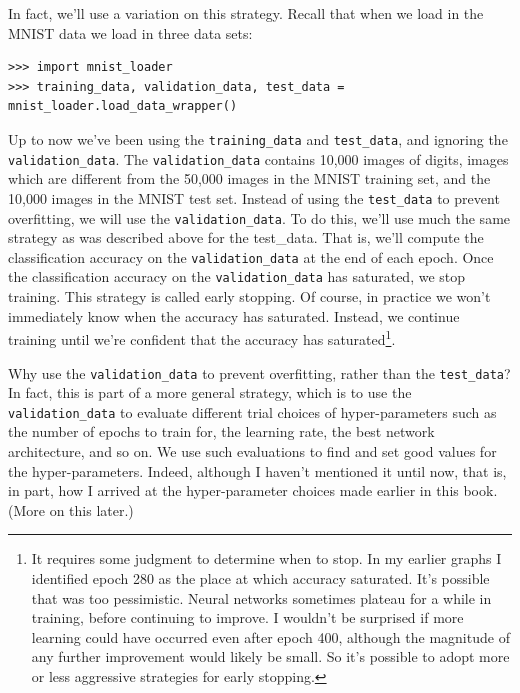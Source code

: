 \documentclass[a4paper,twoside,10pt]{book}
\begin{document}
In fact, we'll use a variation on this strategy. Recall that when we load in the MNIST data we load in three data sets:
\begin{lstlisting}
>>> import mnist_loader 
>>> training_data, validation_data, test_data = mnist_loader.load_data_wrapper()

\end{lstlisting}
Up to now we've been using the \texttt{training\_data} and \texttt{test\_data}, and ignoring the \texttt{validation\_data}. The \texttt{validation\_data} contains 10,000 images of digits, images which are different from the 50,000 images in the MNIST training set, and the 10,000 images in the MNIST test set. Instead of using the \texttt{test\_data} to prevent overfitting, we will use the \texttt{validation\_data}. To do this, we'll use much the same strategy as was described above for the test\_data. That is, we'll compute the classification accuracy on the \texttt{validation\_data} at the end of each epoch. Once the classification accuracy on the \texttt{validation\_data} has saturated, we stop training. This strategy is called early stopping. Of course, in practice we won't immediately know when the accuracy has saturated. Instead, we continue training until we're confident that the accuracy has saturated\footnote{It requires some judgment to determine when to stop. In my earlier graphs I identified epoch 280 as the place at which accuracy saturated. It's possible that was too pessimistic. Neural networks sometimes plateau for a while in training, before continuing to improve. I wouldn't be surprised if more learning could have occurred even after epoch 400, although the magnitude of any further improvement would likely be small. So it's possible to adopt more or less aggressive strategies for early stopping.}.

Why use the \texttt{validation\_data} to prevent overfitting, rather than the \texttt{test\_data}? In fact, this is part of a more general strategy, which is to use the \texttt{validation\_data} to evaluate different trial choices of hyper-parameters such as the number of epochs to train for, the learning rate, the best network architecture, and so on. We use such evaluations to find and set good values for the hyper-parameters. Indeed, although I haven't mentioned it until now, that is, in part, how I arrived at the hyper-parameter choices made earlier in this book. (More on this later.)
\end{document}
